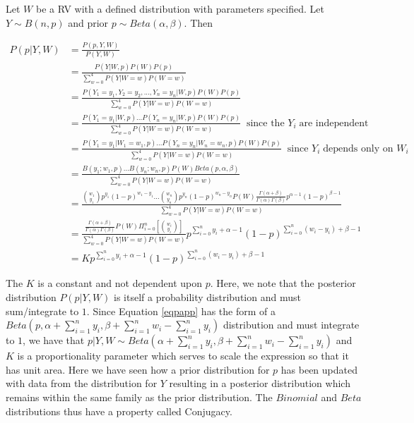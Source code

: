 \documentclass{article}
\begin{document}
\begin{flushleft}

Let $W$ be a RV with a defined distribution with parameters specified. Let $Y \sim B(n,p)$ and prior $p \sim Beta(\alpha,\beta)$. Then

\begin{equation} \label{eqpapp}
\begin{split}
P(p|Y,W) & = \frac{P(p,Y,W)}{P(Y,W)} \\
& = \frac{P(Y|W,p) P(W) P(p)}{\sum_{w=0}^4 P(Y|W=w) P(W=w)} \\
& = \frac{P(Y_1 = y_1,Y_2 = y_2,...,Y_n = y_n|W,p) P(W) P(p)}{\sum_{w=0}^4 P(Y|W=w) P(W=w)} \\
& = \frac{P(Y_1 = y_1|W,p)...P(Y_n = y_n|W,p) P(W) P(p)}{\sum_{w=0}^4 P(Y|W=w) P(W=w)} \;\; \text{since the } Y_i \; \text{are independent}\\
& = \frac{P(Y_1 = y_1|W_1=w_1,p)...P(Y_n = y_n|W_n=w_n,p) P(W) P(p)}{\sum_{w=0}^4 P(Y|W=w) P(W=w)} \;\; \text{since } Y_i \; \text{depends only on } W_i\\
& = \frac{B(y_1;w_1,p)...B(y_n;w_n,p) P(W) Beta(p,\alpha,\beta)}{\sum_{w=0}^4 P(Y|W=w) P(W=w)}\\
& = \frac{{w_1 \choose y_1} p^{y_1} (1-p)^{w_1-y_1}...{w_n \choose y_n} p^{y_n} (1-p)^{w_n-y_n} P(W) \frac{\Gamma(\alpha+\beta)}{\Gamma(\alpha)\Gamma(\beta)}p^{\alpha-1}(1-p)^{\beta-1}}{\sum_{w=0}^4 P(Y|W=w) P(W=w)} \\
&= \frac{\frac{\Gamma(\alpha+\beta)}{\Gamma(\alpha)\Gamma(\beta)} P(W) \Pi_{i=0}^n \left[ {w_i \choose y_i} \right]}{\sum_{w=0}^4 P(Y|W=w) P(W=w)} p^{\sum_{i=0}^n y_i + \alpha - 1} (1-p)^{\sum_{i=0}^n (w_i - y_i) + \beta - 1}\\
&= K p^{\sum_{i=0}^n y_i + \alpha - 1} (1-p)^{\sum_{i=0}^n (w_i - y_i) + \beta - 1}
\end{split}
\end{equation}

The $K$ is a constant and not dependent upon $p$. Here, we note that the posterior distribution $P(p|Y,W)$ is itself a probability distribution and must sum/integrate to $1$. Since Equation \ref{eqpapp} has the form of a $Beta(p,\alpha + \sum_{i=1}^n y_i, \beta + \sum_{i=1}^n w_i - \sum_{i=1}^n y_i)$ distribution and must integrate to $1$, we have that $p|Y,W \sim Beta(\alpha + \sum_{i=1}^n y_i, \beta + \sum_{i=1}^n w_i - \sum_{i=1}^n y_i)$ and $K$ is a proportionality parameter which serves to scale the expression so that it has unit area. Here we have seen how a prior distribution for $p$ has been updated with data from the distribution for $Y$ resulting in a posterior distribution which remains within the same family as the prior distribution. The $Binomial$ and $Beta$ distributions thus have a property called Conjugacy.

\end{flushleft}

\newpage



\end{document}
